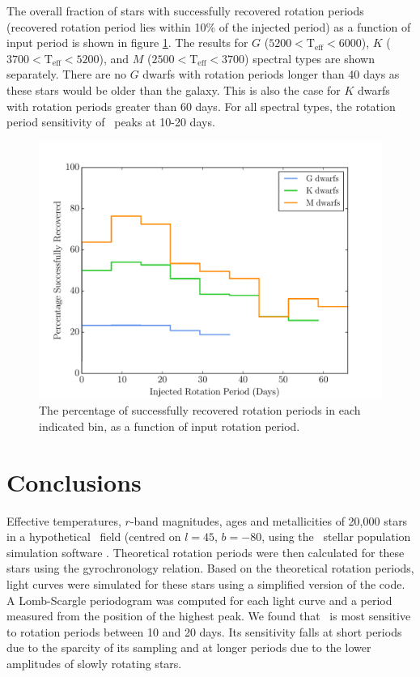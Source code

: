 The overall fraction of stars with successfully recovered rotation periods
(recovered rotation period lies within 10\% of the injected period) as a
function of input period is shown in figure \ref{fig:kickass}.
The results for $G$ ($5200<\mathrm{T}_{\mathrm{eff}}<6000$), $K$
($3700<\mathrm{T}_{\mathrm{eff}}<5200$), and $M$
($2500<\mathrm{T}_{\mathrm{eff}}<3700$) spectral types are shown separately.
There are no $G$ dwarfs with rotation periods longer than 40 days as these
stars would be older than the galaxy.
This is also the case for $K$ dwarfs with rotation periods greater than 60
days.
For all spectral types, the rotation period sensitivity of \LSST\ peaks at
10-20 days.

\begin{figure}
\begin{center}
\includegraphics[width=6in, clip=true]{figures/recovered_hist_-10.pdf}
\caption[\LSST\ rotation period recovery results for different spectral types]
{The percentage of successfully recovered rotation periods in each indicated
bin, as a function of input rotation period.}
\label{fig:kickass}
\end{center}
\end{figure}

\section{Conclusions}
Effective temperatures, $r$-band magnitudes, ages and metallicities of 20,000
stars in a hypothetical \LSST\ field (centred on $l=45$, $b=-80$, using the
\trilegal\ stellar population simulation software \citep{Girardi2012}.
Theoretical rotation periods were then calculated for these stars using the
\citep{Angus2015} gyrochronology relation.
Based on the theoretical rotation periods, light curves were simulated for
these stars using a simplified version of the \citep{Aigrain2015} code.
A Lomb-Scargle periodogram was computed for each light curve and a period
measured from the position of the highest peak.
We found that \LSST\ is most sensitive to rotation periods between 10 and 20
days.
Its sensitivity falls at short periods due to the sparcity of its sampling and
at longer periods due to the lower amplitudes of slowly rotating stars.

